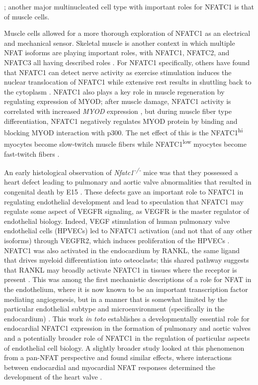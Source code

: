 \citep{Kim2008}; another major multinucleated cell type with important roles for NFATC1 is that of muscle cells. 

Muscle cells allowed for a more thorough exploration of NFATC1 as an electrical and mechanical sensor. Skeletal muscle is another context in which multiple NFAT isoforms are playing important roles, with NFATC1, NFATC2, and NFATC3 all having described roles \citep{Ehlers2014, Tothova2006, McCullagh2004, Delling2000, Amberg2004, Layne2008, Stevenson2001}. For NFATC1 specifically, others have found that NFATC1 can detect nerve activity as exercise stimulation induces the nuclear translocation of NFATC1 while extensive rest results in shuttling back to the cytoplasm \citep{Tothova2006}. NFATC1 also plays a key role in muscle regeneration by regulating expression of MYOD; after muscle damage, NFATC1 activity is correlated with increased \textit{MYOD} expression \citep{Sakuma2003}, but during muscle fiber type differentiation, NFATC1 negatively regulates MYOD protein by binding and blocking MYOD interaction with p300. The net effect of this is the NFATC1\textsuperscript{hi} myocytes become slow\hyp{}twitch muscle fibers while NFATC1\textsuperscript{low} myocytes become fast\hyp{}twitch fibers \citep{Ehlers2014}. 

An early histological observation of \textit{Nfatc1\textsuperscript{\hyp{}/\hyp{}}} mice was that they possessed a heart defect leading to pulmonary and aortic valve abnormalities that resulted in congenital death by E15 \citep{delaPompa1998, Ranger1998b}. These defects gave an important role to NFATC1 in regulating endothelial development and lead to speculation that NFATC1 may regulate some aspect of VEGFR signaling, as VEGFR is the master regulator of endothelial biology. Indeed, VEGF stimulation of human pulmonary valve endothelial cells (HPVECs) led to NFATC1 activation (and not that of any other isoforms) through VEGFR2, which induces proliferation of the HPVECs \citep{Johnson2003a}. NFATC1 was also activated in the endocardium by RANKL, the same ligand that drives myeloid differentiation into osteoclasts; this shared pathway suggests that RANKL may broadly activate NFATC1 in tissues where the receptor is present \citep{Combs2009}. This was among the first mechanistic descriptions of a role for NFAT in the endothelium, where it is now known to be an important transcription factor mediating angiogenesis, but in a manner that is somewhat limited by the particular endothelial subtype and microenvironment (specifically in the endocardium) \citep{Jang2010, Wu2012, Wu2013, Gunawan2020, Courtwright2009}. This work \textit{in toto} establishes a developmentally essential role for endocardial NFATC1 expression in the formation of pulmonary and aortic valves and a potentially broader role of NFATC1 in the regulation of particular aspects of endothelial cell biology. A slightly broader study looked at this phenomenon from a pan\hyp{}NFAT perspective and found similar effects, where interactions between endocardial and myocardial NFAT responses determined the development of the heart valve \citep{Chang2004}.

